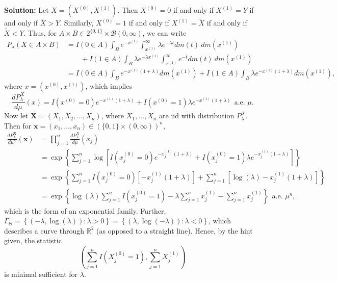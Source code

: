 \documentclass[12pt]{article}
\begin{document}
\textbf{Solution:} Let $X = (X^{(0)}, X^{(1)})$. Then $X^{(0)} = 0$ if and only if $X^{(1)} = Y$ if and only if $\tilde{X} > Y$. Similarly, $X^{(0)} =
1$ if and only if $X^{(1)} = \tilde{X}$ if and only if $\tilde{X} < Y$. Thus, for $A\times B \in 2^{\{0,1\}} \times \mathcal{B}(0,\infty)$, we can
write
\begin{align*}
  P_{\lambda}(X \in A\times B) & = I(0 \in A)\int_{B}e^{-x^{(1)}}\int_{x^{(1)}}^{\infty} \lambda e^{-\lambda t}dm(t)\ dm(x^{(1)})  \\
  & \qquad + I(1 \in A) \int_{B}\lambda e^{-\lambda x^{(1)}} \int_{x^{(1)}}^{\infty} e^{-t} dm(t)\ dm(x^{(1)}) \\
  & = I(0 \in A)\int_{B}e^{-x^{(1)}(1 + \lambda)} dm(x^{(1)}) + I(1 \in A) \int_{B} \lambda e^{-x^{(1)}(1 + \lambda)} dm(x^{(1)}),
\end{align*}
where $x = (x^{(0)}, x^{(1)})$, which implies 
\[
  \frac{dP_{\lambda}^{X}}{d\mu}(x) = I(x^{(0)} = 0) e^{-x^{(1)}(1 + \lambda)} + I(x^{(0)} = 1) \lambda e^{-x^{(1)}(1 + \lambda)} \ \ \text{a.e. } \mu.
\]
Now let $\bm{X} = (X_{1}, X_{2}, \dots, X_{n})$, where $X_1, \dots, X_n$ are iid with distribution $P_{\lambda}^{X}$. Then for 
$\bm{x} = (x_{1}, \dots, x_{n}) \in (\{0,1\}\times (0,\infty))^{n}$,
\begin{align*}
  \frac{dP_{\lambda}^{\bm{X}}}{d\mu^{n}}(\bm{x}) & = \prod_{j=1}^{n} \frac{dP_{\lambda}^{X}}{d\mu}(x_{j}) \\
  & = \exp\left\{ \sum_{j=1}^{n}\log\left[ I(x_{j}^{(0)} = 0) e^{-x_{j}^{(1)}(1 + \lambda)} + I(x_{j}^{(0)} = 1) \lambda e^{-x_{j}^{(1)}(1 + \lambda)}
  \right] \right\} \\
  & = \exp\left\{ \sum_{j=1}^{n}I(x_{j}^{(0)} = 0)\left[ -x_{j}^{(1)}(1 + \lambda) \right] + \sum_{j=1}^{n}\left[ \log(\lambda) - x_{j}^{(1)}(1 +
  \lambda) \right] \right\} \\
  & = \exp\left\{ \log(\lambda)\sum_{j=1}^{n}I(x_{j}^{(0)} = 1) - \lambda\sum_{j=1}^{n}x_{j}^{(1)} - \sum_{j=1}^{n}x_{j}^{(1)} \right\} \ \ \text{a.e.
  } \mu^{n},
\end{align*}
which is the form of an exponential family.
Further, $\Gamma_{\Theta} = \left\{\left(-\lambda, \log(\lambda)\right) : \lambda > 0 \right\} = \left\{ \left(\lambda, \log(-\lambda)\right) : \lambda <
0\right\}$, which describes a curve through $\mathbb{R}^{2}$ (as opposed to a straight line). Hence, by the hint given, the statistic 
\[
  \left( \sum_{j=1}^{n}I(X_{j}^{(0)} = 1), \sum_{j=1}^{n}X_{j}^{(1)} \right)
\]
is minimal sufficient for $\lambda$.
\end{document}
